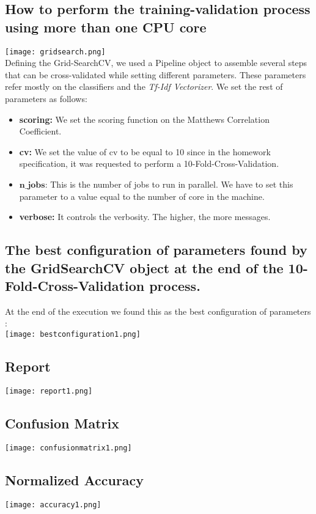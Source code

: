 \documentclass[11pt]{article}
\begin{document}
\subsection{How to perform the training-validation process using more than one CPU core}
\texttt{[image: gridsearch.png]}\\


Defining the Grid-SearchCV, we used a Pipeline object to assemble several steps that can be cross-validated while setting different parameters. 
These parameters refer mostly on the classifiers and the \textit{Tf-Idf Vectorizer}. We set the rest of parameters as follows:
\begin{itemize}
\item{\textbf{scoring:}} We set the scoring function on the Matthews Correlation Coefficient. 
\item{\textbf{cv:}} We set the value of cv to be equal to 10 since in the homework specification, it was requested to perform a 10-Fold-Cross-Validation.
\item{$\textbf{n\_jobs:}$} This is the number of jobs to run in parallel. We have to set this parameter to a value equal to the number of core in the machine. 
\item{\textbf{verbose:}} It controls the verbosity. The higher, the more messages. 

\end{itemize}

\subsection{The best configuration of parameters found by the GridSearchCV object at the end of the
      10-Fold-Cross-Validation process.}

At the end of the execution we found this as the best configuration of parameters : \\
\texttt{[image: bestconfiguration1.png]}


\subsection{Report}
\texttt{[image: report1.png]}

\subsection{Confusion Matrix}
\texttt{[image: confusionmatrix1.png]}

\subsection{Normalized Accuracy}
\texttt{[image: accuracy1.png]}
\end{document}
